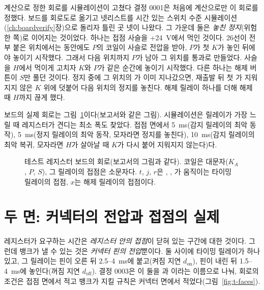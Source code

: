 \begin{lesson}{계산으로 정한 회로를 시뮬레이션이 고쳤다}
결정 0001은 처음에 계산으로만 이 회로를 정했다. 보드를 회로도로 옮기고 넷리스트를 시간 있는 스위치 수준
시뮬레이션(\ref{ch:boardverify}장)으로 돌리자 틀린 곳 넷이 나왔다. 그 가운데 둘은 \emph{놓친 정지}(위험한 쪽)로
이어지는 것이었다. 하나는 접점 사슬을 +24~V에서 먹인 것이다. 26선이 전부 붙은 위치에서는  동안에도
$P$의 코일이 사슬로 전압을 받아, $P$가 첫 $K$가 놓인 뒤에야 놓이기 시작했다. 그래서 다음 위치까지 $P$가 남아
그 위치를 통과로 만들었다. 사슬을 $H$에서 먹이게 고치자 $K$와 $P$가 같은 순간에 놓이기 시작했다. 다른 하나는
해제 버튼이 $S$만 풀던 것이다. 정지 중에 그 위치의 가 이미 지나갔으면, 재출발 뒤 첫 가
지워지지 않은 $K$ 위에 덧붙어 다음 위치의 정지를 놓친다. 해제 릴레이 하나를 더해 해제 때 $H$까지 끊게 했다.
\end{lesson}

보드의 실제 회로는 그림~\ref{fig:t-register-full}이다(보고서와 같은 그림). 시뮬레이션은 릴레이가 가장 느릴 때
레지스터가 견디는 최소 폭도 찾았다. 접점 면에서  5~ms(감지 릴레이의 최악 동작), 
5~ms(정지 릴레이의 최악 동작, 모자라면 정지를 놓친다),  10~ms(감지 릴레이의 최악 복귀, 모자라면
$H$가 살아날 때 $K$가 다시 붙어 지워지지 않는다)다.

\begin{figure}[p]
\centering
\resizebox{\linewidth}{!}{}
\caption{테스트 레지스터 보드의 회로(보고서의 그림과 같다). 코일은 대문자($K_A$, $P$, $S$), 그 릴레이의
접점은 소문자다. $t$, $j$, $r$은 , , 가 움직이는 타이밍 릴레이의 접점,
$x$는 해제 릴레이의 접점이다.}
\label{fig:t-register-full}
\end{figure}

\section{두 면: 커넥터의 전압과 접점의 실제}\label{sec:t-faces}

\Why 레지스터가 요구하는 시간은 \emph{레지스터 안의 접점}이 닫혀 있는 구간에 대한 것이다. 그런데 뱅크가 낼 수
있는 것은 \emph{커넥터 핀의 전압}뿐이다. 둘 사이에 타이밍 릴레이가 하나 있고, 그 릴레이는 핀이 오른 뒤
2.5--4~ms에 붙고(켜짐 지연 $d_{\mathrm{on}}$), 핀이 내린 뒤 1.5--4~ms에 놓인다(꺼짐 지연 $d_{\mathrm{off}}$).
결정 0003은 이 둘을 과 이라는 이름으로 나눠, 회로의
조건은 접점 면에서 적고 뱅크가 지킬 규칙은 커넥터 면에서 적었다(그림~\ref{fig:t-faces}).

